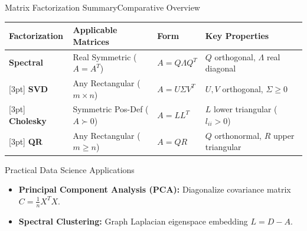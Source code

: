 \documentclass[10pt, aspectratio=169]{beamer}
\begin{document}
\begin{frame}{Matrix Factorization Summary}{Comparative Overview}
  \centering
  \footnotesize
  \begin{tabular}{llll}
    \toprule
    \rowcolor{cardbg}
    \textbf{Factorization} & \textbf{Applicable Matrices} & \textbf{Form} & \textbf{Key Properties} \\
    \midrule
    \textbf{Spectral} & Real Symmetric ($A=A^T$) & $A = Q \Lambda Q^T$ & $Q$ orthogonal, $\Lambda$ real diagonal \\{}
    [3pt]
    \textbf{SVD} & Any Rectangular ($m \times n$) & $A = U \Sigma V^T$ & $U, V$ orthogonal, $\Sigma \ge 0$ \\{}
    [3pt]
    \textbf{Cholesky} & Symmetric Pos-Def ($A \succ 0$) & $A = L L^T$ & $L$ lower triangular ($l_{ii} > 0$) \\{}
    [3pt]
    \textbf{QR} & Any Rectangular ($m \ge n$) & $A = Q R$ & $Q$ orthonormal, $R$ upper triangular \\
    \bottomrule
  \end{tabular}

  \vspace*{0.2cm}

  \begin{conceptbox}{Practical Data Science Applications}
    \small
    \begin{itemize}
      \setlength{\itemsep}{2pt}
      \item \textbf{Principal Component Analysis (PCA):} Diagonalize covariance matrix $C = \frac{1}{n} X^T X$.
      \item \textbf{Spectral Clustering:} Graph Laplacian eigenspace embedding $L = D - A$.
    \end{itemize}
  \end{conceptbox}
\end{frame}
\end{document}

